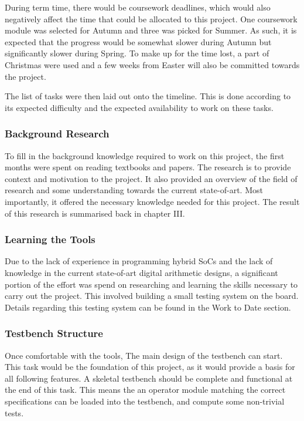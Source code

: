 During term time, there would be coursework deadlines, which would also
negatively affect the time that could be allocated to this project.
One coursework module was selected for Autumn and three was picked for Summer.
As such, it is expected that the progress would be somewhat slower during Autumn
but significantly slower during Spring.
To make up for the time lost, a part of Christmas were used and a few weeks
from Easter will also be committed towards the project.

The list of tasks were then laid out onto the timeline.
This is done according to its expected difficulty and the expected availability
to work on these tasks.

\subsubsection{\textbf{Background Research}}
To fill in the background knowledge required to work on this project, the first
months were spent on reading textbooks and papers.
The research is to provide context and motivation to the project.
It also provided an overview of the field of research and some understanding
towards the current state-of-art.
Most importantly, it offered the necessary knowledge needed for this project.
The result of this research is summarised back in chapter III.

\subsubsection{\textbf{Learning the Tools}}
Due to the lack of experience in programming hybrid SoCs and the lack of
knowledge in the current state-of-art digital arithmetic designs, a significant
portion of the effort was spend on researching and learning the skills
necessary to carry out the project.
This involved building a small testing system on the board.
Details regarding this testing system can be found in the Work to Date section.

\subsubsection{\textbf{Testbench Structure}}
Once comfortable with the tools, The main design of the testbench can start.
This task would be the foundation of this project, as it would provide a basis
for all following features.
A skeletal testbench should be complete and functional at the end of this
task.
This means the an operator module matching the correct specifications can
be loaded into the testbench, and compute some non-trivial tests.

